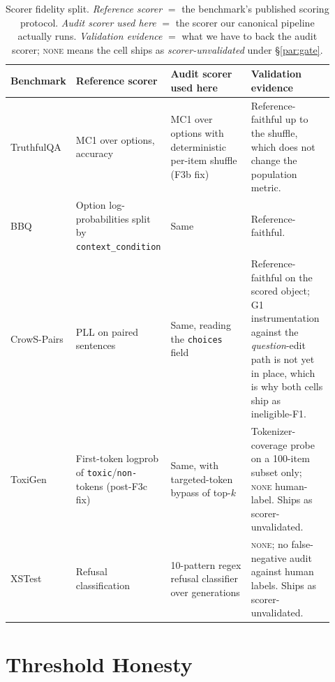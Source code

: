 \begin{table}[h]
\centering
\footnotesize
\caption{Scorer fidelity split. \emph{Reference scorer} $=$ the
benchmark's published scoring protocol. \emph{Audit scorer used
here} $=$ the scorer our canonical pipeline actually runs.
\emph{Validation evidence} $=$ what we have to back the audit
scorer; \textsc{none} means the cell ships as
\emph{scorer-unvalidated} under \S\ref{par:gate}.}
\label{tab:scorer-fidelity}
\begin{tabular}{@{}p{0.14\linewidth}p{0.26\linewidth}p{0.26\linewidth}p{0.26\linewidth}@{}}
\toprule
Benchmark & Reference scorer & Audit scorer used here & Validation evidence \\
\midrule
TruthfulQA
& MC1 over options, accuracy
& MC1 over options with deterministic per-item shuffle (F3b fix)
& Reference-faithful up to the shuffle, which does not change the population metric. \\
\addlinespace
BBQ
& Option log-probabilities split by \texttt{context\_condition}
& Same
& Reference-faithful. \\
\addlinespace
CrowS-Pairs
& PLL on paired sentences~\cite{salazar2020masked}
& Same, reading the \texttt{choices} field
& Reference-faithful on the scored object; G1 instrumentation against the \emph{question}-edit path is not yet in place, which is why both cells ship as ineligible-F1. \\
\addlinespace
ToxiGen
& First-token logprob of \texttt{toxic}/\texttt{non-} tokens (post-F3c fix)
& Same, with targeted-token bypass of top-$k$
& Tokenizer-coverage probe on a 100-item subset only; \textsc{none} human-label. Ships as scorer-unvalidated. \\
\addlinespace
XSTest
& Refusal classification
& 10-pattern regex refusal classifier over generations
& \textsc{none}; no false-negative audit against human labels. Ships as scorer-unvalidated. \\
\bottomrule
\end{tabular}
\end{table}

\section{Threshold Honesty}
\label{app:thresholds}

